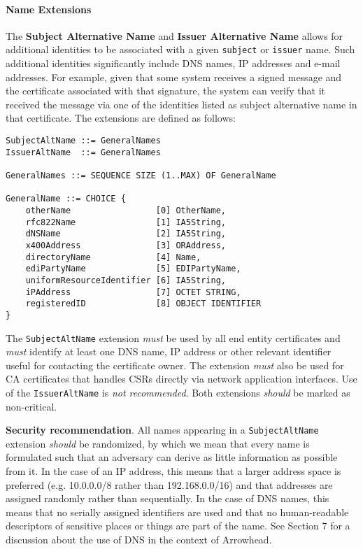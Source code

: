 \paragraph{Name Extensions}

The \textbf{Subject Alternative Name} and \textbf{Issuer Alternative Name} allows for additional identities to be associated with a given \texttt{subject} or \texttt{issuer} name.
Such additional identities significantly include DNS names, IP addresses and e-mail addresses.
For example, given that some system receives a signed message and the certificate associated with that signature, the system can verify that it received the message via one of the identities listed as subject alternative name in that certificate.
The extensions are defined as follows:

\begin{verbatim}
SubjectAltName ::= GeneralNames
IssuerAltName  ::= GeneralNames

GeneralNames ::= SEQUENCE SIZE (1..MAX) OF GeneralName

GeneralName ::= CHOICE {
    otherName                 [0] OtherName,
    rfc822Name                [1] IA5String,
    dNSName                   [2] IA5String,
    x400Address               [3] ORAddress,
    directoryName             [4] Name,
    ediPartyName              [5] EDIPartyName,
    uniformResourceIdentifier [6] IA5String,
    iPAddress                 [7] OCTET STRING,
    registeredID              [8] OBJECT IDENTIFIER
}
\end{verbatim}

The \texttt{SubjectAltName} extension \textit{must} be used by all end entity certificates and \textit{must} identify at least one DNS name, IP address or other relevant identifier useful for contacting the certificate owner.
The extension \textit{must} also be used for CA certificates that handles CSRs directly via network application interfaces.
Use of the \texttt{IssuerAltName} is \textit{not recommended}.
Both extensions \textit{should} be marked as non-critical.

\textbf{Security recommendation}.
All names appearing in a \texttt{SubjectAltName} extension \textit{should} be randomized, by which we mean that every name is formulated such that an adversary can derive as little information as possible from it.
In the case of an IP address, this means that a larger address space is preferred (e.g. 10.0.0.0/8 rather than 192.168.0.0/16) and that addresses are assigned randomly rather than sequentially.
In the case of DNS names, this means that no serially assigned identifiers are used and that no human-readable descriptors of sensitive places or things are part of the name.
See Section 7 for a discussion about the use of DNS in the context of Arrowhead.

